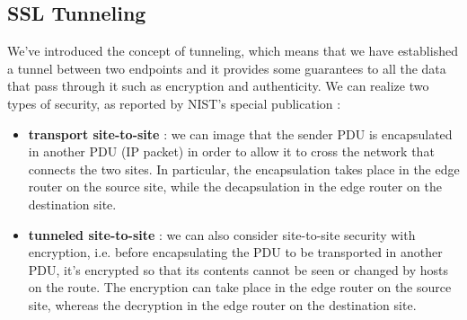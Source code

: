 \documentclass[11pt]{article}
\begin{document}
\subsection{SSL Tunneling}
We've introduced the concept of tunneling, which means that we have established a tunnel between two endpoints and it provides some guarantees to all the data that pass through it such as encryption and authenticity. We can realize two types of security, as reported by NIST's special publication \cite{ssl_vpn} :
\begin{itemize}
\item \textbf{transport site-to-site} : we can image that the sender PDU is encapsulated in another PDU (IP packet) in order to allow it to cross the network that connects the two sites. In particular, the encapsulation takes place in the edge router on the source site, while the decapsulation in the edge router on the destination site.
\item \textbf{tunneled site-to-site} : we can also consider site-to-site security with encryption, i.e. before encapsulating the PDU to be transported in another PDU, it's encrypted so that its contents cannot be seen or changed by hosts on the route. The encryption can take place in the edge router on the source site, whereas the decryption in the edge router on the destination site.
\end{itemize}
\end{document}
